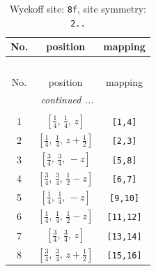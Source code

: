 \documentclass[fleqn,8pt]{jsarticle}
\begin{document}
\begin{longtable}{ccc}
\caption{Wyckoff site: {\tt 8f}, site symmetry: {\tt 2..}}
 \\
 \hline \hline
No. & position & mapping \\ \hline \endfirsthead

\multicolumn{2}{l}{\tablename\ \thetable{}} \\
 \hline \hline
No. & position & mapping \\ \hline \endhead

 \hline \hline
\multicolumn{2}{r}{\footnotesize\it continued ...} \\ \endfoot

 \hline \hline
\multicolumn{2}{r}{} \\ \endlastfoot

1 & $\left[ \frac{1}{4},\, \frac{1}{4},\, z \right]$ & {\tt [1,4]} \\ \hline
2 & $\left[ \frac{1}{4},\, \frac{1}{4},\, z + \frac{1}{2} \right]$ & {\tt [2,3]} \\ \hline
3 & $\left[ \frac{3}{4},\, \frac{3}{4},\, - z \right]$ & {\tt [5,8]} \\ \hline
4 & $\left[ \frac{3}{4},\, \frac{3}{4},\, \frac{1}{2} - z \right]$ & {\tt [6,7]} \\ \hline
5 & $\left[ \frac{1}{4},\, \frac{1}{4},\, - z \right]$ & {\tt [9,10]} \\ \hline
6 & $\left[ \frac{1}{4},\, \frac{1}{4},\, \frac{1}{2} - z \right]$ & {\tt [11,12]} \\ \hline
7 & $\left[ \frac{3}{4},\, \frac{3}{4},\, z \right]$ & {\tt [13,14]} \\ \hline
8 & $\left[ \frac{3}{4},\, \frac{3}{4},\, z + \frac{1}{2} \right]$ & {\tt [15,16]} \\
\end{longtable}
\renewcommand{\arraystretch}{1.2}
\end{document}
